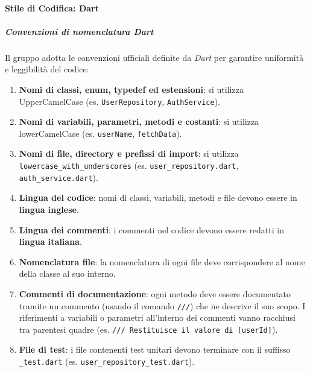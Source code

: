 \documentclass[a4paper,12pt]{article}
\begin{document}
\paragraph{Stile di Codifica: Dart} \label{par:stile-cod-dart}

\subparagraph{Convenzioni di nomenclatura Dart}
Il gruppo adotta le convenzioni ufficiali definite da \textit{Dart} per garantire uniformità e leggibilità del codice:
\begin{enumerate}
    \item \textbf{Nomi di classi, enum, typedef ed estensioni}: si utilizza UpperCamelCase (es. \texttt{UserRepository}, \texttt{AuthService}).
    \item \textbf{Nomi di variabili, parametri, metodi e costanti}: si utilizza lowerCamelCase (es. \texttt{userName}, \texttt{fetchData}).
    \item \textbf{Nomi di file, directory e prefissi di import}: si utilizza \texttt{lowercase\_with\_underscores} (es. \texttt{user\_repository.dart}, \texttt{auth\_service.dart}).
    \item \textbf{Lingua del codice}: nomi di classi, variabili, metodi e file devono essere in \textbf{lingua inglese}.
    \item \textbf{Lingua dei commenti}: i commenti nel codice devono essere redatti in \textbf{lingua italiana}.
    \item \textbf{Nomenclatura file}: la nomenclatura di ogni file deve corrispondere al nome della classe al suo interno.
    \item \textbf{Commenti di documentazione}: ogni metodo deve essere documentato tramite un commento (usando il comando \texttt{///}) che ne descrive il suo scopo.
    I riferimenti a variabili o parametri all'interno dei commenti vanno racchiusi tra parentesi quadre (es. \texttt{/// Restituisce il valore di [userId]}).
    \item \textbf{File di test}: i file contenenti test unitari devono terminare con il suffisso \texttt{\_test.dart} (es. \texttt{user\_repository\_test.dart}).
\end{enumerate}
\end{document}
